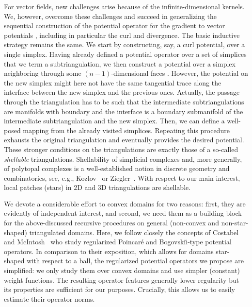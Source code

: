 \documentclass[10pt,a4paper]{article}
\newcommand\cye[1]{%
\protect\leavevmode
\begingroup
    \color{blue}%
    #1%
\endgroup
}
\begin{document}
For vector fields, new challenges arise \cye{because of} the infinite-dimensional kernels. We, \cye{however, overcome these challenges and succeed in generalizing} the sequential construction of the potential operator for the gradient to vector potentials\cye{, including in particular} the curl and divergence. The basic inductive strategy remains the same. We start by constructing, say, a curl potential, over a single simplex. Having already defined a potential operator over a \cye{set of simplices that we term} a subtriangulation, we then construct a potential over a simplex \cye{neighboring through some $(n-1)$-dimensional faces}. However, the potential \cye{on the new simplex} might \cye{here} not have the same tangential trace along the interface between the new simplex and the previous ones. Actually, the passage through the triangulation has to be such that the intermediate subtriangulations are manifolds with boundary and the interface is a boundary submanifold of the intermediate subtriangulation and the new simplex. 
Then, we can define a well-posed \cye{mapping from the already visited simplices.} Repeating this procedure exhausts the original triangulation and eventually provides the desired potential.
These stronger conditions on the triangulations are exactly those of a so-called \emph{shellable} triangulations. Shellability of simplicial complexes and, more generally, of polytopal complexes is a well-established notion in discrete geometry and combinatorics, see, e.g., Kozlov~\cite{kozlov2008combinatorial} or Ziegler~\cite{ziegler1995lectures}.
With respect to our main interest, local \cye{patches} (stars) in 2D and 3D triangulations are shellable. 


\cye{We devote a considerable effort to convex domains for two reasons: first, they are evidently of independent interest, and second, we need them as a building block for the above-discussed recursive procedures on general (non-convex and non-star-shaped) triangulated domains. Here,} we follow closely the \cye{concepts of} Costabel and McIntosh~\cite{costabel2010bogovskiui} who study regularized Poincar\'e and Bogovski\u{\i}-type potential operators. In comparison to their exposition, \cye{which allows for} domains star-shaped with respect to a ball, the regularized potential operators we propose are simplified: we only study them over convex domains and use simpler (constant) weight functions. 
The resulting operator features generally lower regularity \cye{but} its properties are sufficient for our purposes. \cye{Crucially, this allows us to} easily estimate their operator norms. 
\end{document}
